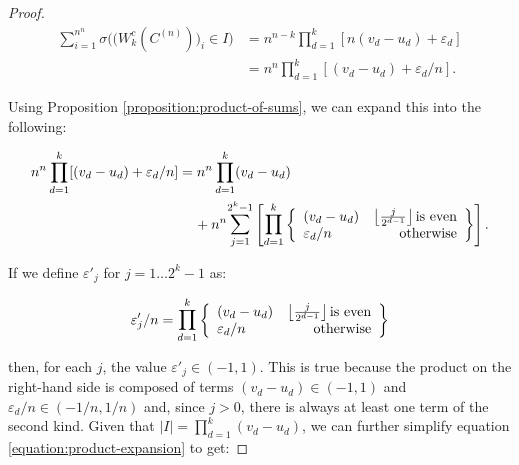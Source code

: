 \documentclass[11pt,a4paper]{tesis}
\theoremstyle{plain}
\theoremstyle{definition}
\begin{document}
\begin{proof}
  \begin{equation}\label{equation:count-windows-c-n}
    \begin{aligned}
      \sum_{i = 1}^{n^n} \sigma\Big( \big( W_k^{c}(C^{(n)}) \big)_i \in I \Big) & = n^{n - k} \prod_{d = 1}^{k} [n (v_d - u_d) + \varepsilon_d] \\
      & = n^n \prod_{d = 1}^{k} [(v_d - u_d) + \varepsilon_d / n] \text{.}
    \end{aligned}
  \end{equation}

  Using Proposition \ref{proposition:product-of-sums}, we can expand this into the following:

  \begin{equation}\label{equation:product-expansion}
    \begin{aligned}
      n^n \prod_{d = 1}^{k} [(v_d - u_d) + \varepsilon_d / n]
      & = n^n \prod_{d = 1}^{k} (v_d - u_d) \\
      & \hspace*{4mm} + n^n \mathlarger{\sum}_{j = 1}^{2^k - 1}
      \left [ \mathlarger{\prod}_{d = 1}^{k} \left \{ \begin{array}{lr}
      (v_d - u_d) & \left\lfloor \frac{j}{2^{d - 1}} \right\rfloor \text{is even} \\
      \varepsilon_d / n & \text{otherwise}
    \end{array} \right \} \right ] \text{.}
    \end{aligned}
  \end{equation}

  If we define $\varepsilon'_j$ for $j = 1 \dots 2^k - 1$ as:

  \begin{equation*}
    \varepsilon'_j / n = \mathlarger{\prod}_{d = 1}^{k} \left \{ \begin{array}{lr}
      (v_d - u_d) & \left\lfloor \frac{j}{2^{d - 1}} \right\rfloor \text{is even} \\
      \varepsilon_d / n & \text{otherwise}
    \end{array} \right \}
  \end{equation*}

  then, for each $j$, the value $\varepsilon'_j \in (-1, 1)$. This is true because the product on the right-hand side is composed of terms $(v_d - u_d) \in (-1, 1)$ and $\varepsilon_d / n \in (-1/n, 1/n)$ and, since $j > 0$, there is always at least one term of the second kind. Given that $|I| = \prod_{d = 1}^{k} (v_d - u_d)$, we can further simplify equation \ref{equation:product-expansion} to get:


\end{proof}
\end{document}
